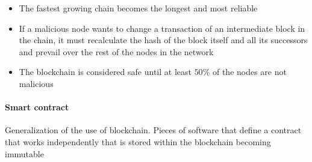 \begin{itemize}
    \item The fastest growing chain becomes the longest and most reliable
    \item If a malicious node wants to change a transaction of an intermediate block in the chain, it must recalculate the hash of the block itself and all its successors and prevail over the rest of the nodes in the network
    \item The blockchain is considered safe until at least $50\%$ of the nodes are not malicious
\end{itemize}

\paragraph{Smart contract}
Generalization of the use of blockchain. Pieces of software that define a contract that works independently that is stored within the blockchain becoming immutable

\newpage